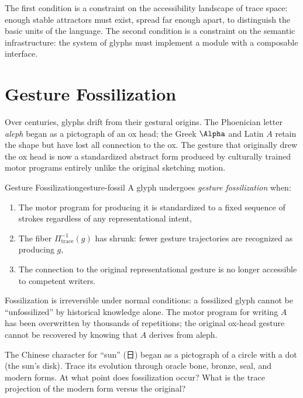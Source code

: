 The first condition is a constraint on the accessibility landscape of
trace space: enough stable attractors must exist, spread far enough
apart, to distinguish the basic units of the language. The second
condition is a constraint on the semantic infrastructure: the system
of glyphs must implement a module with a composable interface.

\section{Gesture Fossilization}

Over centuries, glyphs drift from their gestural origins. The Phoenician
letter \textit{aleph} began as a pictograph of an ox head; the Greek
$\Alpha$ and Latin $A$ retain the shape but have lost all connection
to the ox. The gesture that originally drew the ox head is now a
standardized abstract form produced by culturally trained motor programs
entirely unlike the original sketching motion.

\begin{definition}{Gesture Fossilization}{gesture-fossil}
  A glyph undergoes \emph{gesture fossilization} when:
  \begin{enumerate}
    \item The motor program for producing it is standardized to a fixed
          sequence of strokes regardless of any representational intent,
    \item The fiber $\Pi_\text{trace}^{-1}(g)$ has shrunk: fewer
          gesture trajectories are recognized as producing $g$,
    \item The connection to the original representational gesture is
          no longer accessible to competent writers.
  \end{enumerate}
\end{definition}

Fossilization is irreversible under normal conditions: a fossilized glyph
cannot be ``unfossilized'' by historical knowledge alone. The motor
program for writing $A$ has been overwritten by thousands of repetitions;
the original ox-head gesture cannot be recovered by knowing that $A$
derives from aleph.

\begin{exercise}
  The Chinese character for ``sun'' (日) began as a pictograph of a circle
  with a dot (the sun's disk). Trace its evolution through oracle bone,
  bronze, seal, and modern forms. At what point does fossilization occur?
  What is the trace projection of the modern form versus the original?
\end{exercise}

